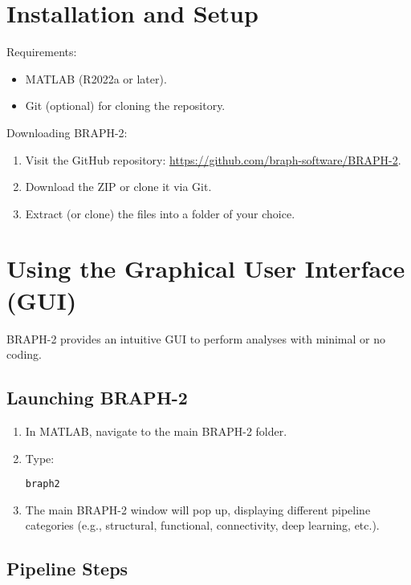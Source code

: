 \documentclass[justified]{tufte-handout}
\begin{document}
\section{Installation and Setup}

Requirements:
\begin{itemize}
    \item MATLAB (R2022a or later).
    \item Git (optional) for cloning the repository.
\end{itemize}

Downloading BRAPH-2:
\begin{enumerate}
    \item Visit the GitHub repository: \href{https://github.com/braph-software/BRAPH-2}{https://github.com/braph-software/BRAPH-2}.
    \item Download the ZIP or clone it via Git.
    \item Extract (or clone) the files into a folder of your choice.
\end{enumerate}

\section{Using the Graphical User Interface (GUI)}

BRAPH-2 provides an intuitive GUI to perform analyses with minimal or no coding.

\subsection{Launching BRAPH-2}

\begin{enumerate}
    \item In MATLAB, navigate to the main BRAPH-2 folder.
    \item Type:
\begin{verbatim}
braph2
\end{verbatim}
    \item The main BRAPH-2 window will pop up, displaying different pipeline categories (e.g., structural, functional, connectivity, deep learning, etc.).
\end{enumerate}

\subsection{Pipeline Steps}
\end{document}
